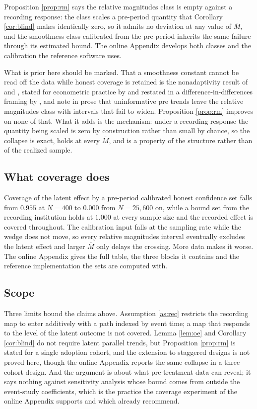 \documentclass[12pt]{article}
\theoremstyle{definition}
\numberwithin{equation}{section}
\begin{document}
Proposition \ref{prop:rm} says the relative magnitudes class is empty against a
recording response: the class scales a pre-period quantity that Corollary
\ref{cor:blind} makes identically zero, so it admits no deviation at any value
of $\bar M$, and the smoothness class calibrated from the pre-period inherits
the same failure through its estimated bound. The online Appendix develops both
classes and the calibration the reference software uses.

What is prior here should be marked. That a smoothness constant cannot be read
off the data while honest coverage is retained is the nonadaptivity result of
\citet{low1997nonparametric} and \citet{cailow2004adaptation}, stated for
econometric practice by \citet{armstrong2020simple} and restated in a
difference-in-differences framing by \citet{freeman2026local}, and
\citet{arora2026trading} note in prose that uninformative pre trends leave the
relative magnitudes class with intervals that fail to widen. Proposition
\ref{prop:rm} improves on none of that. What it adds is the mechanism: under a
recording response the quantity being scaled is zero by construction rather
than small by chance, so the collapse is exact, holds at every $\bar M$, and is
a property of the structure rather than of the realized sample.

\subsection{What coverage does}

Coverage of the latent effect by a pre-period calibrated honest confidence set
falls from $0.955$ at $N = 400$ to $0.000$ from $N = 25{,}600$ on, while a bound
set from the recording institution holds at $1.000$ at every sample size and the
recorded effect is covered throughout. The calibration input falls at the
sampling rate while the wedge does not move, so every relative magnitudes
interval eventually excludes the latent effect and larger $\bar M$ only delays
the crossing. More data makes it worse.
The online Appendix gives the full table, the three blocks it contains and the
reference implementation the sets are computed with.

\subsection{Scope}

Three limits bound the claims above. Assumption \ref{as:rec} restricts the
recording map to enter additively with a path indexed by event time; a map that
responds to the level of the latent outcome is not covered. Lemma \ref{lem:oe}
and Corollary \ref{cor:blind} do not require latent parallel trends, but
Proposition \ref{prop:rm} is stated for a single adoption cohort, and the
extension to staggered designs is not proved here, though the online Appendix
reports the same collapse in a three cohort design. And the argument is about
what pre-treatment data can reveal; it says nothing against sensitivity analysis
whose bound comes from outside the event-study coefficients, which is the
practice the coverage experiment of the online Appendix supports and which
\citet{armstrong2020simple} already recommend.
\end{document}
